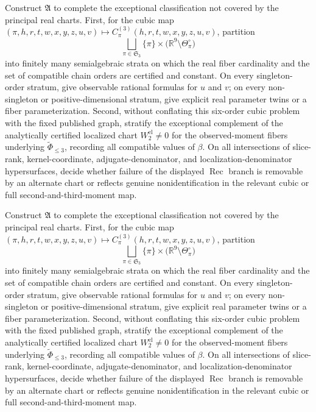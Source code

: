 Construct \(\mathfrak A\) to complete the exceptional classification not covered by the principal real charts.  First, for the cubic map \((\pi,h,r,t,w,x,y,z,u,v)\mapsto C_{\pi}^{(3)}(h,r,t,w,x,y,z,u,v)\), partition
\[
\bigsqcup_{\pi\in\mathfrak S_3}\{\pi\}\times
\bigl(\mathbb R^9\setminus\Theta_{\pi}^{\circ}\bigr)
\]
into finitely many semialgebraic strata on which the real fiber cardinality and the set of compatible chain orders are certified and constant.  On every singleton-order stratum, give observable rational formulas for \(u\) and \(v\); on every non-singleton or positive-dimensional stratum, give explicit real parameter twins or a fiber parameterization.  Second, without conflating this six-order cubic problem with the fixed published graph, stratify the exceptional complement of the analytically certified localized chart \(W_2^{\mathrm{el}}\ne0\) for the observed-moment fibers underlying \(\widetilde\Phi_{\le3}\), recording all compatible values of \(\beta\).  On all intersections of slice-rank, kernel-coordinate, adjugate-denominator, and localization-denominator hypersurfaces, decide whether failure of the displayed \(\operatorname{Rec}\) branch is removable by an alternate chart or reflects genuine nonidentification in the relevant cubic or full second-and-third-moment map.

Construct \(\mathfrak A\) to complete the exceptional classification not covered by the principal real charts.  First, for the cubic map \((\pi,h,r,t,w,x,y,z,u,v)\mapsto C_{\pi}^{(3)}(h,r,t,w,x,y,z,u,v)\), partition
\[
\bigsqcup_{\pi\in\mathfrak S_3}\{\pi\}\times
\bigl(\mathbb R^9\setminus\Theta_{\pi}^{\circ}\bigr)
\]
into finitely many semialgebraic strata on which the real fiber cardinality and the set of compatible chain orders are certified and constant.  On every singleton-order stratum, give observable rational formulas for \(u\) and \(v\); on every non-singleton or positive-dimensional stratum, give explicit real parameter twins or a fiber parameterization.  Second, without conflating this six-order cubic problem with the fixed published graph, stratify the exceptional complement of the analytically certified localized chart \(W_2^{\mathrm{el}}\ne0\) for the observed-moment fibers underlying \(\widetilde\Phi_{\le3}\), recording all compatible values of \(\beta\).  On all intersections of slice-rank, kernel-coordinate, adjugate-denominator, and localization-denominator hypersurfaces, decide whether failure of the displayed \(\operatorname{Rec}\) branch is removable by an alternate chart or reflects genuine nonidentification in the relevant cubic or full second-and-third-moment map.


